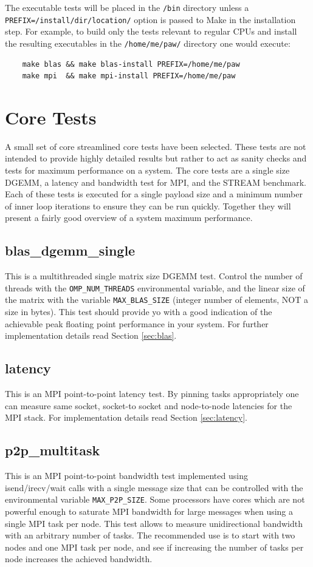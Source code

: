 \documentclass[10pt,a4paper]{report}
\begin{document}
The executable tests will be placed in the \verb+/bin+ directory unless a \verb+PREFIX=/install/dir/location/+ option is passed to Make in the installation step. For example, to build only the tests relevant to regular CPUs and install the resulting executables in the \verb+/home/me/paw/+ directory one would execute:

\begin{verbatim}
    make blas && make blas-install PREFIX=/home/me/paw
    make mpi  && make mpi-install PREFIX=/home/me/paw
\end{verbatim}

\FloatBarrier
\chapter{Core Tests}
A small set of core streamlined core tests have been selected. These tests are not intended to provide highly detailed results but rather to act as sanity checks and tests for maximum performance on a system. The core tests are a single size DGEMM, a latency and bandwidth test for MPI, and the STREAM benchmark. Each of these tests is executed for a single payload size and a minimum number of inner loop iterations to ensure they can be run quickly. Together they will present a fairly good overview of a system maximum performance.

\section*{blas\_dgemm\_single}
This is a multithreaded single matrix size DGEMM test. Control the number of threads with the \verb+OMP_NUM_THREADS+ environmental variable, and the linear size of the matrix with the variable \verb+MAX_BLAS_SIZE+ (integer number of elements, NOT a size in bytes). This test should provide yo with a good indication of the achievable peak floating point performance in your system. For further implementation details read Section \ref{sec:blas}.

\section*{latency}
This is an MPI point-to-point latency test. By pinning tasks appropriately one can measure same socket, socket-to socket and node-to-node latencies for the MPI stack. For implementation details read Section \ref{sec:latency}.

\section*{p2p\_multitask} 
This is an MPI point-to-point bandwidth test implemented using isend/irecv/wait calls with a single message size that can be controlled with the environmental variable \verb+MAX_P2P_SIZE+. Some processors have cores which are not powerful enough to saturate MPI bandwidth for large messages when using a single MPI task per node. This test allows to measure unidirectional bandwidth with an arbitrary number of tasks. The recommended use is to start with two nodes and one MPI task per node, and see if increasing the number of tasks per node increases the achieved bandwidth.
\end{document}
